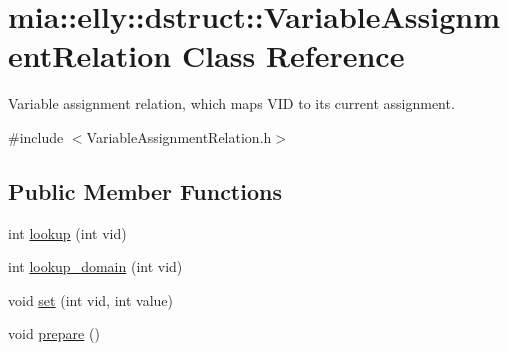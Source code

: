 \hypertarget{classmia_1_1elly_1_1dstruct_1_1_variable_assignment_relation}{\section{mia\-:\-:elly\-:\-:dstruct\-:\-:Variable\-Assignment\-Relation Class Reference}
\label{classmia_1_1elly_1_1dstruct_1_1_variable_assignment_relation}
}


Variable assignment relation, which maps V\-I\-D to its current assignment.  




{\ttfamily \#include $<$Variable\-Assignment\-Relation.\-h$>$}

\subsection*{Public Member Functions}
\begin{DoxyCompactItemize}
\item 
int \hyperlink{classmia_1_1elly_1_1dstruct_1_1_variable_assignment_relation_adae435f1b7fe6ccbf4857d3a19a0f88a}{lookup} (int vid)
\item 
int \hyperlink{classmia_1_1elly_1_1dstruct_1_1_variable_assignment_relation_ad8c41e6f6a09c0fa5bb7e01b48e49875}{lookup\-\_\-domain} (int vid)
\item 
void \hyperlink{classmia_1_1elly_1_1dstruct_1_1_variable_assignment_relation_a226adad0ad27177aeeda5df1f0064290}{set} (int vid, int value)
\item 
void \hyperlink{classmia_1_1elly_1_1dstruct_1_1_variable_assignment_relation_a745e2d0883b72b0b2140bbd0b791b0d2}{prepare} ()
\end{DoxyCompactItemize}
